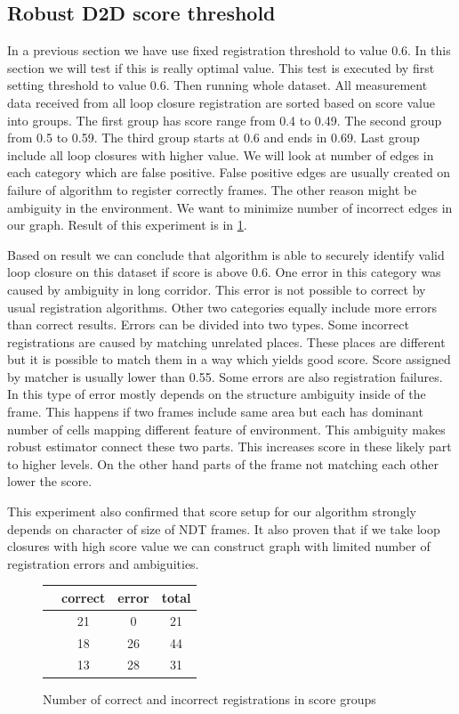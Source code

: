 \subsection {Robust D2D score threshold}
In a previous section we have use fixed registration threshold to value 0.6. In this section we will test if this is really optimal value. This test is executed by first setting threshold to value 0.6. Then running whole dataset. All measurement data received from all loop closure registration are sorted based on score value into groups. The first group  has score range from 0.4 to 0.49. The second group from 0.5 to 0.59. The third group starts at 0.6 and ends in 0.69. Last group include all loop closures with higher value. We will look at number of edges in each category which are false positive. False positive edges are usually created on failure of algorithm to register correctly frames. The other reason might be ambiguity in the environment. We want to minimize number of incorrect edges in our graph. Result of this experiment is in \ref{fig:robust_matcher_res}.

Based on result we can conclude that algorithm is able to securely identify valid loop closure on this dataset if score is above 0.6. One error in this category was caused by ambiguity in long corridor. This error is not possible to correct by usual registration algorithms. Other two categories equally include more errors than correct results. Errors can be divided into two types. Some incorrect registrations are caused by matching unrelated places. These places are different but it is possible to match them in a way which yields good score. Score assigned by matcher is usually lower than 0.55. Some errors are also registration failures. In this type of error mostly depends on the structure ambiguity inside of the frame. This happens if two frames include same area but each has dominant number of cells mapping different feature of environment. This ambiguity makes robust estimator connect these two parts. This increases score in these likely part to higher levels. On the other hand parts of the frame not matching each other lower the score.

This experiment also confirmed that score setup for our algorithm strongly depends on character of size of \gls{NDT} frames. It also proven that if we take loop closures with high score value we can construct graph with limited number of registration errors and ambiguities.    


\begin{figure}
 \centering
  \begin{tabular}{ | c | c | c | c | }
    \hline
    &correct&error&total\\ \hline
    [0.7,1] & 21 & 0& 21\\ \hline
    [0.6, 0.7) & 33 & 1& 34\\ \hline
    [0.5, 0.6)] & 18 & 26& 44\\ \hline
    [0.4, 0.5)]& 13 & 28& 31\\
    \hline
  \end{tabular}
	\caption{Number of correct and incorrect registrations in score groups}  \label{fig:robust_matcher_res}
\end{figure} 

